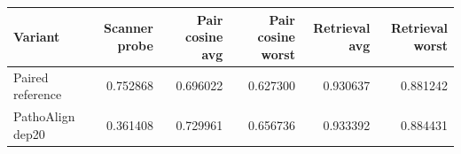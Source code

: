 \begin{tabular}{lrrrrr}
\toprule
Variant & Scanner probe & Pair cosine avg & Pair cosine worst & Retrieval avg & Retrieval worst \\
\midrule
Paired reference & 0.752868 & 0.696022 & 0.627300 & 0.930637 & 0.881242 \\
PathoAlign dep20 & 0.361408 & 0.729961 & 0.656736 & 0.933392 & 0.884431 \\
\bottomrule
\end{tabular}
